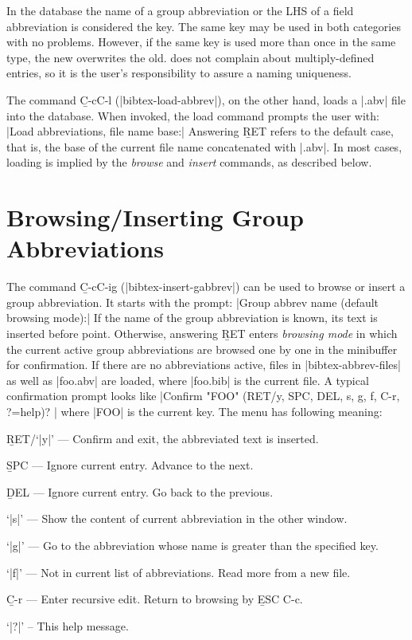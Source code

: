 In the database the name of a group abbreviation or 
the LHS of a field abbreviation is considered the key.
The same key may be used in both categories with no problems.
However, if the same key is used more than once in the same type,
the new overwrites the old.  {\BM} does not complain about multiply-defined
entries, so it is the user's responsibility to assure a naming uniqueness.

The command {\b C-c{\s}C-l} (|bibtex-load-abbrev|),
on the other hand, loads a |.abv| file into the database.
When invoked, the load command prompts the user with:
\begindisplay
|Load abbreviations, file name base:| \block\cr
\enddisplay
Answering {\b RET} refers to the default case, that is, the base
of the current file name concatenated with |.abv|.
In most cases, loading is implied by the {\it browse\/} and {\it insert\/}
commands, as described below.


\section{Browsing/Inserting Group Abbreviations}

\noindent
The command {\b C-c{\s}C-i{\s}g} (|bibtex-insert-gabbrev|)
can be used to browse or insert a group abbreviation.
It starts with the prompt:
\begindisplay
|Group abbrev name (default browsing mode):| \block\cr
\enddisplay
If the name of the group abbreviation is known, its text is inserted before 
point.  Otherwise, answering {\b RET} enters {\it browsing mode\/}
in which the current active group abbreviations are browsed one by one
in the minibuffer for confirmation.  If there are no abbreviations active,
files in |bibtex-abbrev-files| as well as |foo.abv| are loaded,
where |foo.bib| is the current file.
A typical confirmation prompt
looks like
\begindisplay
|Confirm "FOO" (RET/y, SPC, DEL, s, g, f, C-r, ?=help)? |\cr
\enddisplay
where |FOO| is the current key.  The menu has following meaning:
\item{\bull}{{\b RET}/`|y|' --- Confirm and exit, the abbreviated text is
inserted.}
\item{\bull}{{\b SPC} --- Ignore current entry.  Advance to the next.}
\item{\bull}{{\b DEL} --- Ignore current entry.  Go back to the previous.}
\item{\bull}{`|s|' --- Show the content of current abbreviation in the other
window.}
\item{\bull}{`|g|' --- Go to the abbreviation whose name is greater than the
specified key.}
\item{\bull}{`|f|' --- Not in current list of abbreviations.  Read more from
a new file.}
\item{\bull}{{\b C-r} --- Enter recursive edit.  Return to browsing by
{\b ESC C-c}.}
\item{\bull}{`|?|' -- This help message.}

